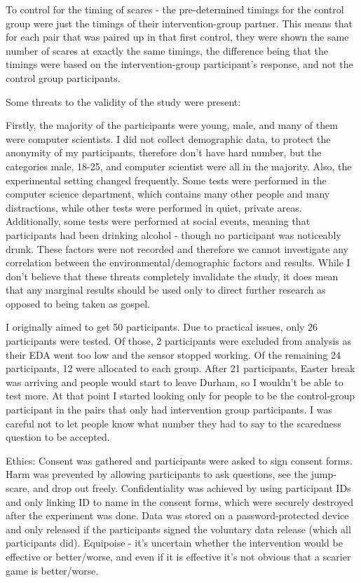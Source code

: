 \documentclass[12pt,a4paper]{article}\usepackage[]{graphicx}\usepackage[]{color}
\begin{document}
To control for the timing of scares - the pre-determined timings for the control group were just the timings of their intervention-group partner.
This means that for each pair that was paired up in that first control, they were shown the same number of scares at exactly the same timings, the difference being that the timings were based on the intervention-group participant's response, and not the control group participants.

Some threats to the validity of the study were present:

Firstly, the majority of the participants were young, male, and many of them were computer scientists.
I did not collect demographic data, to protect the anonymity of my participants, therefore don't have hard number, but the categories male, 18-25, and computer scientist were all in the majority.
Also, the experimental setting changed frequently.
Some tests were performed in the computer science department, which contains many other people and many distractions, while other tests were performed in quiet, private areas.
Additionally, some tests were performed at social events, meaning that participants had been drinking alcohol - though no participant was noticeably drunk.
These factors were not recorded and therefore we cannot investigate any correlation between the environmental/demographic factors and results.
While I don't believe that these threats completely invalidate the study, it does mean that any marginal results should be used only to direct further research as opposed to being taken as gospel.

I originally aimed to get 50 participants. Due to practical issues, only 26 participants were tested. Of those, 2 participants were excluded from analysis as their EDA went too low and the sensor stopped working. Of the remaining 24 participants, 12 were allocated to each group. After 21 participants, Easter break was arriving and people would start to leave Durham, so I wouldn't be able to test more. At that point I started looking only for people to be the control-group participant in the pairs that only had intervention group participants. I was careful not to let people know what number they had to say to the scaredness question to be accepted.

Ethics:
Consent was gathered and participants were asked to sign consent forms.
Harm was prevented by allowing participants to ask questions, see the jump-scare, and drop out freely.
Confidentiality was achieved by using participant IDs and only linking ID to name in the consent forms, which were securely destroyed after the experiment was done. Data was stored on a password-protected device and only released if the participants signed the voluntary data release (which all participants did).
Equipoise - it's uncertain whether the intervention would be effective or better/worse, and even if it is effective it's not obvious that a scarier game is better/worse.
\end{document}
